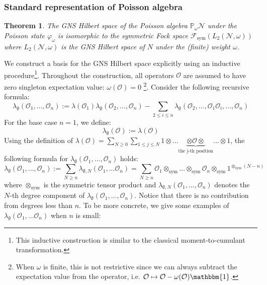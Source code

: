\documentclass[a4paper,11pt]{article}
\newtheorem{theorem}{Theorem}
\theoremstyle{definition}
\numberwithin{equation}{section}
\begin{document}
\subsubsection{Standard representation of Poisson algebra}
\begin{theorem}
    The GNS Hilbert space of the Poisson algebra $\mathbb{P}_\omega \mathcal{N}$ under the Poisson state $\varphi_\omega$ is isomorphic to the symmetric Fock space $\mathcal{F}_\text{sym}(L_2(\mathcal{N},\omega))$ where $L_2(\mathcal{N},\omega)$ is the GNS Hilbert space of $N$ under the (finite) weight $\omega$.
\end{theorem}
We construct a basis for the GNS Hilbert space explicitly using an inductive procedure\footnote{This inductive construction is similar to the classical moment-to-cumulant transformation.}. Throughout the construction, all operators $\mathcal{O}$ are assumed to have zero singleton expectation value: $\omega(\mathcal{O})= 0$ \footnote{When $\omega$ is finite, this is not restrictive since we can always subtract the expectation value from the operator, i.e. $\mathcal{O}\mapsto \mathcal{O} - \omega(\mathcal{O})\mathbbm{1}$.}. Consider the following recursive formula:
\begin{equation}\label{equation:recursion}
    \lambda_\emptyset(\mathcal{O}_1,...,\mathcal{O}_n) := \lambda(\mathcal{O}_1)\lambda_\emptyset(\mathcal{O}_2,...,\mathcal{O}_n) - \sum_{2\leq i\leq n}\lambda_\emptyset(\mathcal{O}_2,...,\mathcal{O}_1\mathcal{O}_i,...,\mathcal{O}_n)
\end{equation}
For the base case $n = 1$, we define:
\begin{equation}
    \lambda_\emptyset(\mathcal{O}) := \lambda(\mathcal{O})
\end{equation}
Using the definition of $\lambda(\mathcal{O}) = \sum_{N\geq 0}\sum_{1\leq j\leq N}1\otimes...\underbrace{\otimes \mathcal{O}\otimes}_\text{the j-th position}...\otimes 1$, the following formula for $\lambda_\emptyset(\mathcal{O}_1,...,\mathcal{O}_n)$ holds:
\begin{equation}\label{equation:generalbasis}
    \lambda_\emptyset(\mathcal{O}_1,...,\mathcal{O}_n):= \sum_{N\geq n}\lambda_{\emptyset,N}(\mathcal{O}_1,...\mathcal{O}_n)  = \sum_{N\geq n}\mathcal{O}_1\otimes_\text{sym}...\otimes_\text{sym}\mathcal{O}_n\otimes_\text{sym} 1^{\otimes_\text{sym}(N - n)}
\end{equation}
where $\otimes_\text{sym}$ is the symmetric tensor product and $\lambda_{\emptyset,N}(\mathcal{O}_1,...,\mathcal{O}_n)$ denotes the $N$-th degree component of $\lambda_\emptyset(\mathcal{O}_1,...,\mathcal{O}_n)$. Notice that there is no contribution from degrees less than $n$. To be more concrete, we give some examples of $\lambda_\emptyset(\mathcal{O}_1,...\mathcal{O}_n)$ when $n$ is small:
\end{document}
